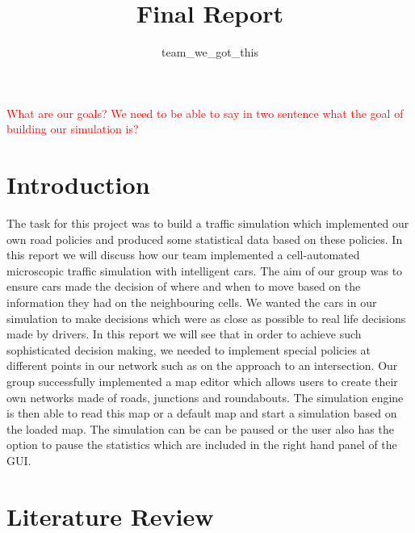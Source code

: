 \documentclass{article}
\begin{document}
	
	
	\title{Final Report}
	\author{team\_we\_got\_this}
	\maketitle
	\thispagestyle{plain}
	\graphicspath{ {Images/} }
	
	\tableofcontents
	\listoffigures
	\listoftables
	\vspace{2cm}
	\textcolor{red}{What are our goals? We need to be able to say in two sentence what the goal of building our simulation is? }
	
	\pagebreak
	\section{Introduction}
	The task for this project was to build a traffic simulation which implemented our own road policies and produced some statistical data based on these policies. In this report we will discuss how our team implemented a cell-automated microscopic traffic simulation with intelligent cars. The aim of our group was to ensure cars made the decision of where and when to move based on the information they had on the neighbouring cells.  We wanted the cars in our simulation to make decisions which were as close as possible to real life decisions made by drivers. In this report we will see that in order to achieve such sophisticated decision making, we needed to implement special policies at different points in our network such as on the approach to an intersection. Our group successfully implemented a map editor which allows users to create their own networks made of roads, junctions and roundabouts. The simulation engine is then able to read this map or a default map and start a simulation based on the loaded map. The simulation can be can be paused or the user also has the option to pause the statistics which are included in the right hand panel of the GUI. 
	\section{Literature Review}
	
\end{document}
